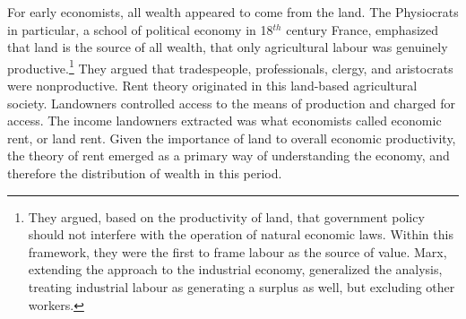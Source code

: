 For early economists, all wealth appeared to come from the land. The Physiocrats in particular, a school of \gls{political economy} in 18$^{th}$ century France, emphasized that land is the source of all wealth, that only agricultural labour was genuinely productive.\footnote{They argued, based on the productivity of land, that government policy should not interfere with the operation of natural economic laws. Within this framework, they were the first to frame labour as the source of value. Marx, extending the approach to the industrial economy, generalized the analysis, treating industrial labour as generating a surplus as well, %
but excluding other workers.} They argued that tradespeople, professionals, clergy, and aristocrats were nonproductive. 
Rent theory originated in this land-based agricultural society. Landowners controlled access to the means of production and charged for access. 
The income landowners extracted was what economists called \gls{economic rent}, or \gls{land rent}.
Given the importance of land to overall economic productivity, the theory of rent emerged as a primary way of understanding the economy, and therefore the distribution of wealth in this period.

